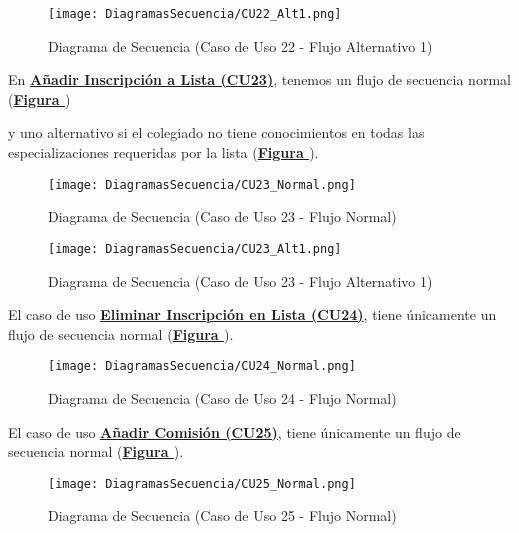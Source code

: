 \begin{figure}[!htbp]
  \centering
  \texttt{[image: DiagramasSecuencia/CU22\_Alt1.png]}
  \caption{Diagrama de Secuencia (Caso de Uso 22 - Flujo Alternativo 1)}
  \label{fig:Secuencia_CU22_Alt1}
\end{figure}
\FloatBarrier

\addtocounter{figura}{1}
En \textbf{\hyperref[tab:curCrearInscrLst]{Añadir Inscripción a Lista (CU23)}}, tenemos un flujo de secuencia normal (\textbf{\hyperref[fig:Secuencia_CU23_Normal]{Figura }}) \addtocounter{figura}{1} y uno alternativo si el colegiado no tiene conocimientos en todas las especializaciones requeridas por la lista (\textbf{\hyperref[fig:Secuencia_CU23_Alt1]{Figura }}).
\begin{figure}[!htbp]
  \centering
  \texttt{[image: DiagramasSecuencia/CU23\_Normal.png]}
  \caption{Diagrama de Secuencia (Caso de Uso 23 - Flujo Normal)}
  \label{fig:Secuencia_CU23_Normal}
\end{figure}
\FloatBarrier

\begin{figure}[!htbp]
  \centering
  \texttt{[image: DiagramasSecuencia/CU23\_Alt1.png]}
  \caption{Diagrama de Secuencia (Caso de Uso 23 - Flujo Alternativo 1)}
  \label{fig:Secuencia_CU23_Alt1}
\end{figure}
\FloatBarrier

\addtocounter{figura}{1}
El caso de uso \textbf{\hyperref[tab:curEliminarInscrLst]{Eliminar Inscripción en Lista (CU24)}}, tiene únicamente un flujo de secuencia normal (\textbf{\hyperref[fig:Secuencia_CU24_Normal]{Figura }}).
\begin{figure}[!htbp]
  \centering
  \texttt{[image: DiagramasSecuencia/CU24\_Normal.png]}
  \caption{Diagrama de Secuencia (Caso de Uso 24 - Flujo Normal)}
  \label{fig:Secuencia_CU24_Normal}
\end{figure}
\FloatBarrier

\addtocounter{figura}{1} \pagebreak
El caso de uso \textbf{\hyperref[tab:curCrearComision]{Añadir Comisión (CU25)}}, tiene únicamente un flujo de secuencia normal (\textbf{\hyperref[fig:Secuencia_CU25_Normal]{Figura }}).
\begin{figure}[!htbp]
  \centering
  \texttt{[image: DiagramasSecuencia/CU25\_Normal.png]}
  \caption{Diagrama de Secuencia (Caso de Uso 25 - Flujo Normal)}
  \label{fig:Secuencia_CU25_Normal}
\end{figure}
\FloatBarrier

